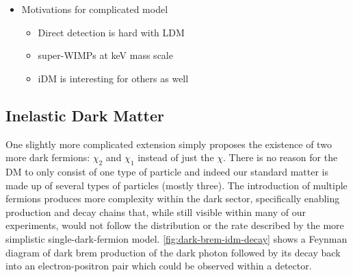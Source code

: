 \begin{itemize}
  \item Motivations for complicated model
        \begin{itemize}
          \item Direct detection is hard with LDM \cite{ldmconstraints-2019}
          \item super-WIMPs at keV mass scale \cite{superwimps-2008}
          \item iDM is interesting for others as well \cite{darkseaquest-2018}
        \end{itemize}
\end{itemize}

\subsection{Inelastic Dark Matter}
\label{sec:theory-idm}

One slightly more complicated extension simply proposes the existence of two more dark fermions:
\(\chi_2\) and \(\chi_1\) instead of just the \(\chi\). There is no reason for the DM to only
consist of one type of particle and indeed our standard matter is made up of several types of
particles (mostly three). The introduction of multiple fermions produces more complexity within the
dark sector, specifically enabling production and decay chains that, while still visible within
many of our experiments, would not follow the distribution or the rate described by the more
simplistic single-dark-fermion model. \cref{fig:dark-brem-idm-decay} shows a Feynman diagram of
dark brem production of the dark photon followed by its decay back into an electron-positron
pair which could be observed within a detector.

